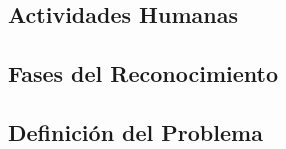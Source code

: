 \subsection{Actividades Humanas}

\subsection{Fases del Reconocimiento}

\subsection{Definición del Problema}


